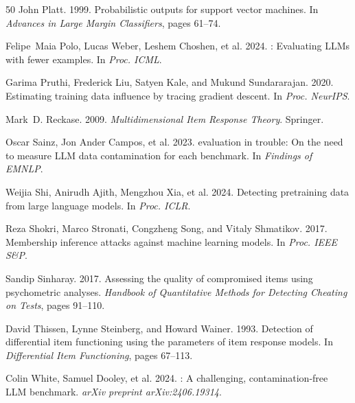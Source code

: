 \documentclass[11pt,a4paper]{article}
\begin{document}
\begin{thebibliography}{50}
John Platt. 1999.
\newblock Probabilistic outputs for support vector machines.
\newblock In \emph{Advances in Large Margin Classifiers}, pages 61--74.

Felipe~Maia Polo, Lucas Weber, Leshem Choshen, et al. 2024.
: Evaluating {LLM}s with fewer examples.
\newblock In \emph{Proc. ICML}.

Garima Pruthi, Frederick Liu, Satyen Kale, and Mukund Sundararajan. 2020.
\newblock Estimating training data influence by tracing gradient descent.
\newblock In \emph{Proc. NeurIPS}.

Mark~D. Reckase. 2009.
\newblock \emph{Multidimensional Item Response Theory}.
\newblock Springer.

Oscar Sainz, Jon Ander Campos, et al. 2023.
 evaluation in trouble: On the need to measure {LLM} data contamination for each benchmark.
\newblock In \emph{Findings of EMNLP}.

Weijia Shi, Anirudh Ajith, Mengzhou Xia, et al. 2024.
\newblock Detecting pretraining data from large language models.
\newblock In \emph{Proc. ICLR}.

Reza Shokri, Marco Stronati, Congzheng Song, and Vitaly Shmatikov. 2017.
\newblock Membership inference attacks against machine learning models.
\newblock In \emph{Proc. IEEE S\&P}.

Sandip Sinharay. 2017.
\newblock Assessing the quality of compromised items using psychometric analyses.
\newblock \emph{Handbook of Quantitative Methods for Detecting Cheating on Tests}, pages 91--110.

David Thissen, Lynne Steinberg, and Howard Wainer. 1993.
\newblock Detection of differential item functioning using the parameters of item response models.
\newblock In \emph{Differential Item Functioning}, pages 67--113.

Colin White, Samuel Dooley, et al. 2024.
: A challenging, contamination-free {LLM} benchmark.
\newblock \emph{arXiv preprint arXiv:2406.19314}.


\end{thebibliography}
\end{document}
